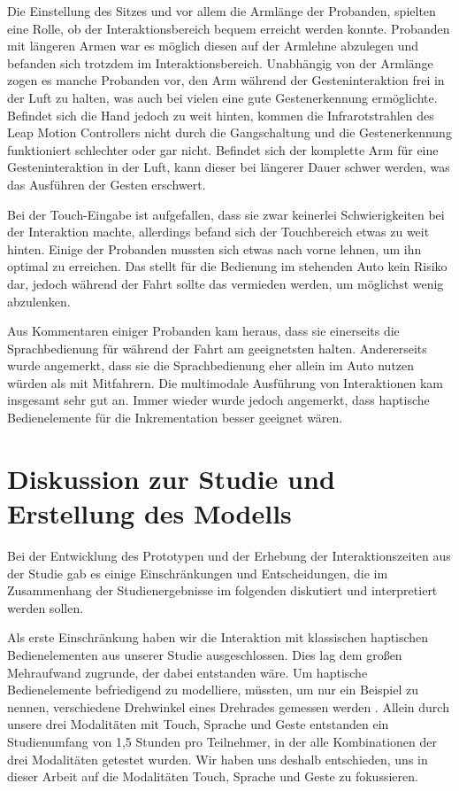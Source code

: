 Die Einstellung des Sitzes und vor allem die Armlänge der Probanden, spielten eine Rolle, ob der Interaktionsbereich bequem erreicht werden konnte. 
Probanden mit längeren Armen war es möglich diesen auf der Armlehne abzulegen und befanden sich trotzdem im Interaktionsbereich. 
Unabhängig von der Armlänge zogen es manche Probanden vor, den Arm während der Gesteninteraktion frei in der Luft zu halten, was auch bei vielen eine gute Gestenerkennung ermöglichte. 
Befindet sich die Hand jedoch zu weit hinten, kommen die Infrarotstrahlen des Leap Motion Controllers nicht durch die Gangschaltung und die Gestenerkennung funktioniert schlechter oder gar nicht. 
Befindet sich der komplette Arm für eine Gesteninteraktion in der Luft, kann dieser bei längerer Dauer schwer werden, was das Ausführen der Gesten erschwert.  

Bei der Touch-Eingabe ist aufgefallen, dass sie zwar keinerlei Schwierigkeiten bei der Interaktion machte, allerdings befand sich der Touchbereich etwas zu weit hinten. 
Einige der Probanden mussten sich etwas nach vorne lehnen, um ihn optimal zu erreichen. 
Das stellt für die Bedienung im stehenden Auto kein Risiko dar, jedoch während der Fahrt sollte das vermieden werden, um möglichst wenig abzulenken. 

Aus Kommentaren einiger Probanden kam heraus, dass sie einerseits die Sprachbedienung für während der Fahrt am geeignetsten halten. Andererseits wurde angemerkt, dass sie die Sprachbedienung eher allein im Auto nutzen würden als mit Mitfahrern. 
Die multimodale Ausführung von Interaktionen kam insgesamt sehr gut an. 
Immer wieder wurde jedoch angemerkt, dass haptische Bedienelemente für die Inkrementation besser geeignet wären. 

\section[Diskussion]{Diskussion zur Studie und Erstellung des Modells}
Bei der Entwicklung des Prototypen und der Erhebung der Interaktionszeiten aus der Studie gab es einige Einschränkungen und Entscheidungen, die im Zusammenhang der Studienergebnisse im folgenden diskutiert und interpretiert werden sollen.

Als erste Einschränkung haben wir die Interaktion mit klassischen haptischen Bedienelementen aus unserer Studie ausgeschlossen. 
Dies lag dem großen Mehraufwand zugrunde, der dabei entstanden wäre. 
Um haptische Bedienelemente befriedigend zu modelliere, müssten, um nur ein Beispiel zu nennen, verschiedene Drehwinkel eines Drehrades gemessen werden \citep{schneegass_2009}. 
Allein durch unsere drei Modalitäten mit Touch, Sprache und Geste entstanden ein Studienumfang von 1,5 Stunden pro Teilnehmer, in der alle Kombinationen der drei Modalitäten getestet wurden. 
Wir haben uns deshalb entschieden, uns in dieser Arbeit auf die Modalitäten Touch, Sprache und Geste zu fokussieren. 

